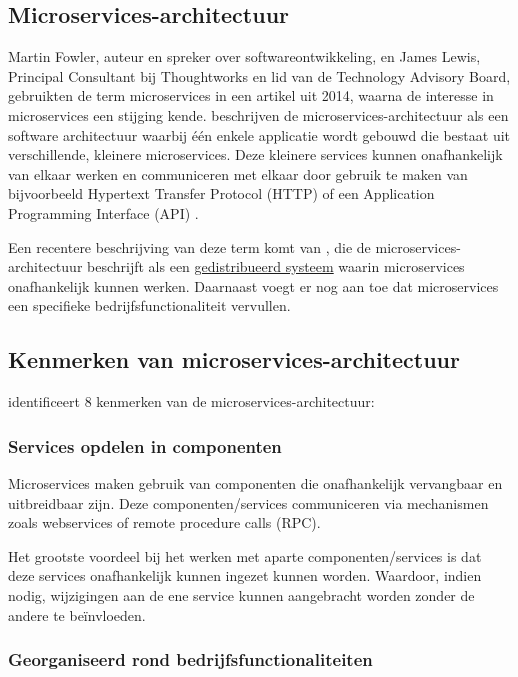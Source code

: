 \subsection{Microservices-architectuur}

Martin Fowler, auteur en spreker over softwareontwikkeling, en James Lewis, Principal Consultant bij Thoughtworks en lid van de Technology Advisory Board, gebruikten de term microservices in een artikel uit 2014, waarna de interesse in microservices een stijging kende. \textcite{Lewis2014} beschrijven de microservices-architectuur als een software architectuur waarbij één enkele applicatie wordt gebouwd die bestaat uit verschillende, kleinere microservices. Deze kleinere services kunnen onafhankelijk van elkaar werken en communiceren met elkaar door gebruik te maken van bijvoorbeeld Hypertext Transfer Protocol (HTTP) of een Application Programming Interface (API) \autocite{Lewis2014}.

Een recentere beschrijving van deze term komt van \textcite{Velepucha2023}, die de microservices-architectuur beschrijft als een \hyperref[sec:dissys]{gedistribueerd systeem} waarin microservices onafhankelijk kunnen werken. Daarnaast voegt \textcite{Velepucha2023} er nog aan toe dat microservices een specifieke bedrijfsfunctionaliteit vervullen.

\subsection{Kenmerken van microservices-\-architectuur}

\textcite{Bakshi2017} identificeert 8 kenmerken van de microservices-architectuur:

\subsubsection{Services opdelen in componenten}

Microservices maken gebruik van componenten die onafhankelijk vervangbaar en uitbreidbaar zijn. Deze componenten/services communiceren via mechanismen zoals webservices of remote procedure calls (RPC).

Het grootste voordeel bij het werken met aparte componenten/services is dat deze services onafhankelijk kunnen ingezet kunnen worden. Waardoor, indien nodig, wijzigingen aan de ene service kunnen aangebracht worden zonder de andere te beïnvloeden.

\subsubsection{Georganiseerd rond bedrijfsfunctionaliteiten}


